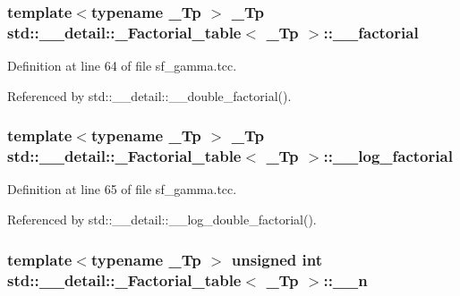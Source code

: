 \subsubsection[{\texorpdfstring{\+\_\+\+\_\+factorial}{__factorial}}]{\setlength{\rightskip}{0pt plus 5cm}template$<$typename \+\_\+\+Tp $>$ \+\_\+\+Tp {\bf std\+::\+\_\+\+\_\+detail\+::\+\_\+\+Factorial\+\_\+table}$<$ \+\_\+\+Tp $>$\+::\+\_\+\+\_\+factorial}\hypertarget{structstd_1_1____detail_1_1__Factorial__table_a4e8d20f3fa301037b097bb9f8e5f2060}{}\label{structstd_1_1____detail_1_1__Factorial__table_a4e8d20f3fa301037b097bb9f8e5f2060}


Definition at line 64 of file sf\+\_\+gamma.\+tcc.



Referenced by std\+::\+\_\+\+\_\+detail\+::\+\_\+\+\_\+double\+\_\+factorial().

\subsubsection[{\texorpdfstring{\+\_\+\+\_\+log\+\_\+factorial}{__log_factorial}}]{\setlength{\rightskip}{0pt plus 5cm}template$<$typename \+\_\+\+Tp $>$ \+\_\+\+Tp {\bf std\+::\+\_\+\+\_\+detail\+::\+\_\+\+Factorial\+\_\+table}$<$ \+\_\+\+Tp $>$\+::\+\_\+\+\_\+log\+\_\+factorial}\hypertarget{structstd_1_1____detail_1_1__Factorial__table_a9d4b412d4d8b46ec660b0441516f412c}{}\label{structstd_1_1____detail_1_1__Factorial__table_a9d4b412d4d8b46ec660b0441516f412c}


Definition at line 65 of file sf\+\_\+gamma.\+tcc.



Referenced by std\+::\+\_\+\+\_\+detail\+::\+\_\+\+\_\+log\+\_\+double\+\_\+factorial().

\subsubsection[{\texorpdfstring{\+\_\+\+\_\+n}{__n}}]{\setlength{\rightskip}{0pt plus 5cm}template$<$typename \+\_\+\+Tp $>$ unsigned int {\bf std\+::\+\_\+\+\_\+detail\+::\+\_\+\+Factorial\+\_\+table}$<$ \+\_\+\+Tp $>$\+::\+\_\+\+\_\+n}\hypertarget{structstd_1_1____detail_1_1__Factorial__table_ac05bdbe9d5090f0aa53adf8a3f8e3a45}{}\label{structstd_1_1____detail_1_1__Factorial__table_ac05bdbe9d5090f0aa53adf8a3f8e3a45}


